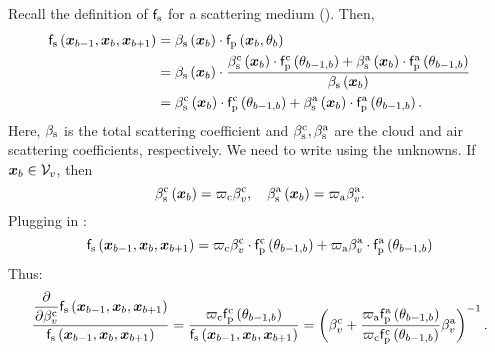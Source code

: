 \documentclass{article}
\begin{document}
Recall the definition of $\mathsf{f}_{\text{s}}$ for a scattering medium (\eqnopar{\ref{eq:fs}}). Then,
\begin{equation}
\begin{split}
\mathsf{f}_{\text{s}}\left({\boldsymbol{x}_{b-1},\boldsymbol{x}_{b},\boldsymbol{x}_{b+1}}\right)&=\beta_{\text{s}}\left({\boldsymbol{x}_{b}}\right)\cdot\mathsf{f}_{\text{p}}\left({\boldsymbol{x}_{b},\theta_{b}}\right)\\
&=\beta_{\text{s}}\left({\boldsymbol{x}_{b}}\right)\cdot\frac{\beta_{\text{s}}^{\text{c}}\left({\boldsymbol{x}_{b}}\right)\cdot\mathsf{f}^{\text{c}}_{\text{p}}\left({\theta_{b-1,b}}\right)+\beta_{\text{s}}^{\text{a}}\left({\boldsymbol{x}_{b}}\right)\cdot\mathsf{f}^{\text{a}}_{\text{p}}\left({\theta_{b-1,b}}\right)}{\beta_{\text{s}}\left({\boldsymbol{x}_{b}}\right)}\\
&=\beta_{\text{s}}^{\text{c}}\left({\boldsymbol{x}_{b}}\right)\cdot\mathsf{f}^{\text{c}}_{\text{p}}\left({\theta_{b-1,b}}\right)+\beta_{\text{s}}^{\text{a}}\left({\boldsymbol{x}_{b}}\right)\cdot\mathsf{f}^{\text{a}}_{\text{p}}\left({\theta_{b-1,b}}\right).
\end{split}
\label{eq:fs_scattering}
\end{equation}
Here, $\beta_{\text{s}}$ is the total scattering coefficient and  $\beta_{\text{s}}^{\text{c}}, \beta_{\text{s}}^{\text{a}}$ are the cloud and air scattering coefficients, respectively. We need to write \eq{\ref{eq:fs_scattering}} using the unknowns. If $\boldsymbol{x}_{b}\in\mathcal{V}_{v}$, then
\begin{equation}
\label{eq:unknown_term}
\beta_{\text{s}}^{\text{c}}\left({\boldsymbol{x}_{b}}\right) = \varpi_{\text{c}}\beta^{\text{c}}_{v}, \quad \beta_{\text{s}}^{\text{a}}\left({\boldsymbol{x}_{b}}\right) = \varpi_{\text{a}}\beta^{\text{a}}_{v}.
\end{equation}
Plugging \eq{\ref{eq:unknown_term}} in \eq{\ref{eq:fs_scattering}}:
\begin{equation}
\label{eq:fs_using_unknowns}
\mathsf{f}_{\text{s}}\left({\boldsymbol{x}_{b-1},\boldsymbol{x}_{b},\boldsymbol{x}_{b+1}}\right) = \varpi_{\text{c}}\beta^{\text{c}}_{v}\cdot\mathsf{f}_{\text{p}}^{\text{c}}\left({\theta_{b-1,b}}\right)+\varpi_{\text{a}}\beta^{\text{a}}_{v}\cdot\mathsf{f}_{\text{p}}^{\text{a}}\left({\theta_{b-1,b}}\right)
\end{equation}
Thus:
\begin{equation}
\label{eq:fs_deriv}
\frac{\dfrac{\partial}{\partial {\beta^{\text{c}}_v}}\mathsf{f}_{\text{s}}\left({\boldsymbol{x}_{b-1},\boldsymbol{x}_{b},\boldsymbol{x}_{b+1}}\right)}{\mathsf{f}_{\text{s}}\left({\boldsymbol{x}_{b-1},\boldsymbol{x}_{b},\boldsymbol{x}_{b+1}}\right)}=
\dfrac{\varpi_{\text{c}}\mathsf{f}_{\text{p}}^{\text{c}}\left({\theta_{b-1,b}}\right)}{\mathsf{f}_{\text{s}}\left({\boldsymbol{x}_{b-1},\boldsymbol{x}_{b},\boldsymbol{x}_{b+1}}\right)} =
\left({\beta^{\text{c}}_{v}+\dfrac{\varpi_{\text{a}}\mathsf{f}_{\text{p}}^{\text{a}}\left({\theta_{b-1,b}}\right)}{\varpi_{\text{c}}\mathsf{f}_{\text{p}}^{\text{c}}\left({\theta_{b-1,b}}\right)}\beta^{\text{a}}_{v}}\right) ^ {-1}.
\end{equation}
\end{document}
